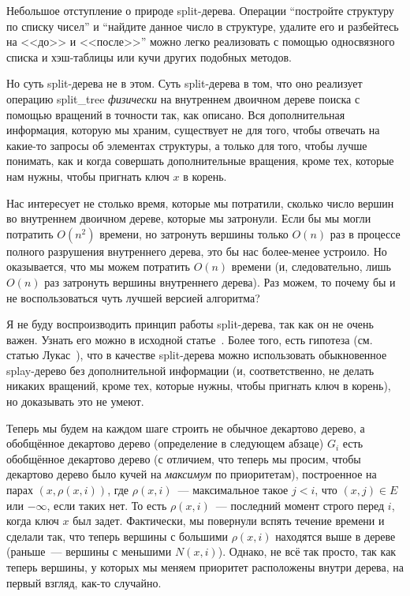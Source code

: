 \begin{remark} Небольшое отступление о природе split-дерева. Операции ``постройте структуру по списку чисел'' и ``найдите данное число в структуре, удалите его и разбейтесь на <<до>> и <<после>>'' можно легко реализовать с помощью односвязного списка и хэш-таблицы или кучи других подобных методов.

Но суть split-дерева не в этом. Суть split-дерева в том, что оно реализует операцию \textrm{split\_tree} \emph{физически} на внутреннем двоичном дереве поиска с помощью вращений в точности так, как описано. Вся дополнительная информация, которую мы храним, существует не для того, чтобы отвечать на какие-то запросы об элементах структуры, а только для того, чтобы лучше понимать, как и когда совершать дополнительные вращения, кроме тех, которые нам нужны, чтобы пригнать ключ $x$ в корень.

Нас интересует не столько время, которые мы потратили, сколько число вершин во внутреннем двоичном дереве, которые мы затронули. Если бы мы могли потратить $O(n^2)$ времени, но затронуть вершины только $O(n)$ раз в процессе полного разрушения внутреннего дерева, это бы нас более-менее устроило. Но оказывается, что мы можем потратить $O(n)$ времени (и, следовательно, лишь $O(n)$ раз затронуть вершины внутреннего дерева). Раз можем, то почему бы и не воспользоваться чуть лучшей версией алгоритма?

Я не буду воспроизводить принцип работы split-дерева, так как он не очень важен. Узнать его можно в исходной статье~\cite{DHIKP}. Более того, есть гипотеза (см. статью Лукас~\cite{Luc88}), что в качестве split-дерева можно использовать обыкновенное splay-дерево без дополнительной информации (и, соответственно, не делать никаких вращений, кроме тех, которые нужны, чтобы пригнать ключ в корень), но доказывать это не умеют.
\end{remark}

Теперь мы будем на каждом шаге строить не обычное декартово дерево, а обобщённое декартово дерево (определение в следующем абзаце) $G_i$
есть обобщённое декартово дерево (с отличием, что теперь мы просим, чтобы декартово дерево было кучей на \emph{максимум} по приоритетам), построенное на парах $(x, \rho(x, i))$, где $\rho(x, i)$~--- максимальное такое $j < i$, что $(x, j) \in E$ или $-\infty$, если таких нет. То есть $\rho(x, i)$~--- последний момент строго перед $i$, когда ключ $x$ был задет. Фактически, мы повернули вспять течение времени и сделали так, что теперь вершины с большими $\rho(x, i)$ находятся выше в дереве (раньше~--- вершины с меньшими $N(x, i)$). Однако, не всё так просто, так как теперь вершины, у которых мы меняем приоритет расположены внутри дерева, на первый взгляд, как-то случайно.

